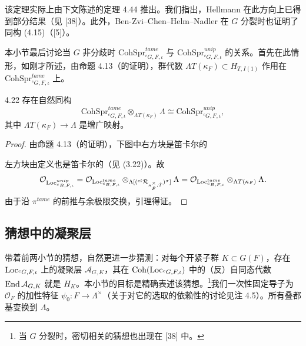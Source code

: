 该定理实际上由下文陈述的定理 4.44 推出。我们指出，Hellmann 在此方向上已得到部分结果（见 [38]）。此外，Ben-Zvi–Chen–Helm–Nadler 在 $G$ 分裂时也证明了同构 (4.15)（[5]）。

本小节最后讨论当 $G$ 非分歧时 $\mathrm{CohSpr}^{tame}_{{}^cG,F,\iota}$ 与 $\mathrm{CohSpr}^{unip}_{{}^cG,F,\iota}$ 的关系。首先在此情形，如刚才所述，由命题 4.13（的证明），群代数 $\Lambda T(\kappa_F)\subset H_{T,I(1)}$ 作用在 $\mathrm{CohSpr}^{tame}_{{}^cG,F,\iota}$ 上。

\begin{lem}{4.22}
存在自然同构
\[
\mathrm{CohSpr}^{tame}_{{}^cG,F,\iota}\otimes_{\Lambda T(\kappa_F)}\Lambda\cong\mathrm{CohSpr}^{unip}_{{}^cG,F,\iota},
\]
其中 $\Lambda T(\kappa_F)\to\Lambda$ 是增广映射。
\end{lem}

\begin{proof}
由命题 4.13（的证明），下图中右方块是笛卡尔的
\begin{center}
\end{center}
左方块由定义也是笛卡尔的（见 (3.22)）。故
\[
\mathcal{O}_{\operatorname{Loc}^{unip}_{{}^cB,F,\iota}}
=\mathcal{O}_{\operatorname{Loc}^{tame}_{{}^cB,F,\iota}}\otimes_{\Lambda[({}^{cl}\mathcal{R}_{\kappa_{\breve F}^\times,\hat T})^\sigma]}\Lambda
=\mathcal{O}_{\operatorname{Loc}^{tame}_{{}^cB,F,\iota}}\otimes_{\Lambda T(\kappa_F)}\Lambda.
\]
由于沿 $\pi^{tame}$ 的前推与余极限交换，引理得证。
\end{proof}

\subsection{猜想中的凝聚层}
带着前两小节的猜想，自然更进一步猜测：对每个开紧子群 $K\subset G(F)$，存在 $\operatorname{Loc}_{{}^cG,F,\iota}$ 上的凝聚层 $\mathcal{A}_{G,K}$，其在 $\operatorname{Coh}(\operatorname{Loc}_{{}^cG,F,\iota})$ 中的（反）自同态代数 $\operatorname{End}\mathcal{A}_{G,K}$ 就是 $H_K$。本小节的目标是精确表述该猜想。\footnote{当 $G$ 分裂时，密切相关的猜想也出现在 [38] 中。}我们一次性固定导子为 $\mathcal{O}_F$ 的加性特征 $\psi_0:F\to\Lambda^\times$（关于对它的选取的依赖性的讨论见注 4.5）。所有叠都基变换到 $\Lambda$。

